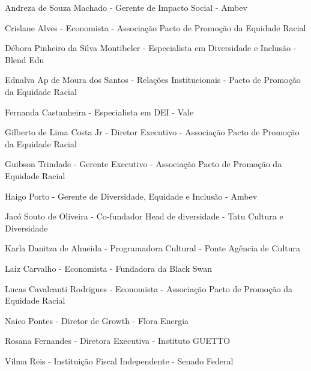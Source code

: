 \small
\par Andreza de Souza Machado -  Gerente de Impacto Social - Ambev
\vspace{0.2cm}
\par Crislane Alves - Economista - Associação Pacto de Promoção da Equidade Racial
\vspace{0.2cm}
\par Débora Pinheiro da Silva Montibeler -  Especialista em Diversidade e Inclusão - Blend Edu
\vspace{0.2cm}
\par Ednalva Ap de Moura dos Santos - Relações Institucionais - Pacto de Promoção da Equidade Racial
\vspace{0.2cm}
\par Fernanda Castanheira - Especialista em DEI -  Vale
\vspace{0.2cm}
\par Gilberto de Lima Costa Jr - Diretor Executivo - Associação Pacto de Promoção da Equidade Racial
\vspace{0.2cm}
\par Guibson Trindade - Gerente Executivo - Associação Pacto de Promoção da Equidade Racial
\vspace{0.2cm}
\par Haigo Porto - Gerente de Diversidade, Equidade e Inclusão -  Ambev
\vspace{0.2cm}
\par Jacó Souto de Oliveira  -  Co-fundador Head de diversidade  - Tatu Cultura e Diversidade
\vspace{0.2cm}
\par Karla Danitza de Almeida - Programadora Cultural - Ponte Agência de Cultura
\vspace{0.2cm}
\par Laiz Carvalho -  Economista - Fundadora da Black Swan
\vspace{0.2cm}
\par Lucas Cavalcanti Rodrigues - Economista - Associação Pacto de Promoção da Equidade Racial
\vspace{0.2cm}
\par Naico Pontes - Diretor de Growth - Flora Energia
\vspace{0.2cm}
\par Rosana Fernandes - Diretora Executiva - Instituto GUETTO
\vspace{0.2cm}
\par Vilma Reis - Instituição Fiscal Independente - Senado Federal

\clearpage
